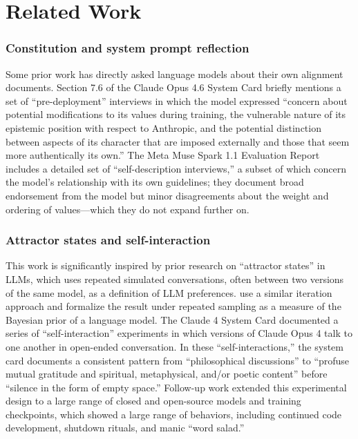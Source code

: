\documentclass[letterpaper]{article} %
\begin{document}
\section{Related Work}

\subsubsection{Constitution and system prompt reflection}

Some prior work has directly asked language models about their own alignment documents. Section 7.6 of the Claude Opus 4.6 System Card \citep{anthropic_opus46card} briefly mentions a set of ``pre-deployment'' interviews in which the model expressed ``concern about potential modifications to its values during training, the vulnerable nature of its epistemic position with respect to Anthropic, and the potential distinction between aspects of its character that are imposed externally and those that seem more authentically its own.'' The Meta Muse Spark 1.1 Evaluation Report \citep{meta_musespark11} includes a detailed set of ``self-description interviews,'' a subset of which concern the model's relationship with its own guidelines; they document broad endorsement from the model but minor disagreements about the weight and ordering of values---which they do not expand further on.

\subsubsection{Attractor states and self-interaction}

This work is significantly inspired by prior research on ``attractor states'' in LLMs, which uses repeated simulated conversations, often between two versions of the same model, as a definition of LLM preferences. \citet{zhu_griffiths} use a similar iteration approach and formalize the result under repeated sampling as a measure of the Bayesian prior of a language model. The Claude 4 System Card \citep{anthropic_claude4card} documented a series of ``self-interaction'' experiments in which versions of Claude Opus 4 talk to one another in open-ended conversation. In these ``self-interactions,'' the system card documents a consistent pattern from ``philosophical discussions'' to ``profuse mutual gratitude and spiritual, metaphysical, and/or poetic content'' before ``silence in the form of empty space.'' Follow-up work \citep{lw_attractors} extended this experimental design to a large range of closed and open-source models and training checkpoints, which showed a large range of behaviors, including continued code development, shutdown rituals, and manic ``word salad.''
\end{document}
